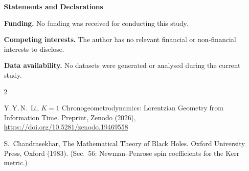 \documentclass[11pt,a4paper]{article}
\begin{document}
\bigskip
\noindent\textbf{Statements and Declarations}

\medskip\noindent\textbf{Funding.}
No funding was received for conducting this study.

\medskip\noindent\textbf{Competing interests.}
The author has no relevant financial or non-financial interests
to disclose.

\medskip\noindent\textbf{Data availability.}
No datasets were generated or analysed during the current study.

\begin{thebibliography}{2}

Y.\,Y.\,N.~Li,
$K{=}1$ Chronogeometrodynamics: Lorentzian Geometry from
Information Time.
Preprint, Zenodo (2026), \url{https://doi.org/10.5281/zenodo.19469558}

S.~Chandrasekhar,
The Mathematical Theory of Black Holes.
Oxford University Press, Oxford (1983).
(Sec.~56: Newman--Penrose spin coefficients for the Kerr metric.)

\end{thebibliography}
\end{document}
